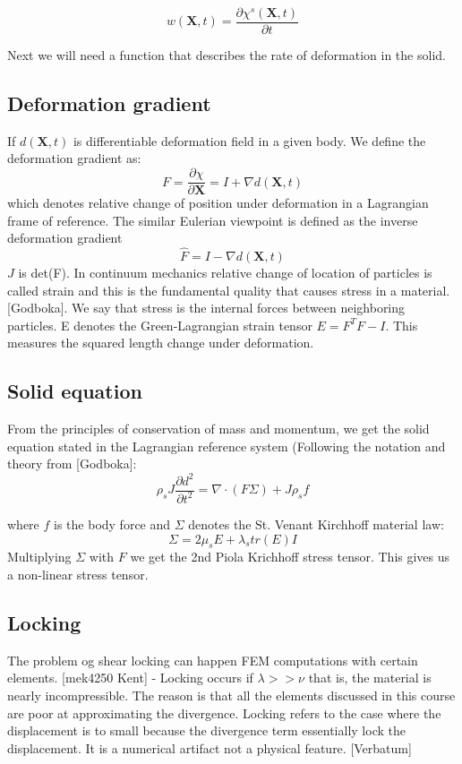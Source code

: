 $$  w(\textbf{X},t) = \frac{\partial \chi^s(\textbf{X},t)}{\partial t}   $$



Next we will need a function that describes the rate of deformation in the solid.
\subsection*{Deformation gradient}
If $d(\textbf{X},t)$ is differentiable deformation field in a given body. We define the deformation gradient as:  
$$F = \frac{\partial \chi}{\partial \textbf{X}} = I + \nabla d(\textbf{X},t)$$ 
which denotes relative change of position under deformation in a Lagrangian frame of reference. The similar Eulerian viewpoint is defined as the inverse deformation gradient 
$$ \hat{F} = I - \nabla  d(\textbf{X},t)$$
$J$ is det(F).
In continuum mechanics relative change of location of particles is called strain and this is the fundamental quality that causes stress in a material. [Godboka]. We say that stress is the internal forces between neighboring particles. E denotes the Green-Lagrangian strain tensor $ E = F^TF - I$. This measures the squared length change under deformation.

\subsection*{Solid equation}
From the principles of conservation of mass and momentum, we get the solid equation stated in the Lagrangian reference system (Following the notation and theory from [Godboka]:
\begin{equation}
\rho_s J \frac{\partial d^2}{\partial t^2} = \nabla \cdot ( F \Sigma ) + J\rho_s f 
\end{equation}

where $f$ is the body force and $\Sigma $ denotes the St. Venant Kirchhoff material law: 
$$ \Sigma = 2\mu_s E + \lambda_s tr(E) I $$ 
Multiplying $\Sigma $ with $F$ we get the 2nd Piola Krichhoff stress tensor. This gives us a non-linear stress tensor.

\subsection*{Locking}
The problem og shear locking can happen FEM computations with certain elements. 
[mek4250 Kent] - Locking occurs if  $ \lambda >> \nu $ that is, the material is nearly incompressible. The reason is that all the elements discussed in this course are poor at approximating the divergence. Locking refers to the case where the displacement is to small because the divergence term essentially lock the displacement. It is a numerical artifact not a physical feature. [Verbatum]






